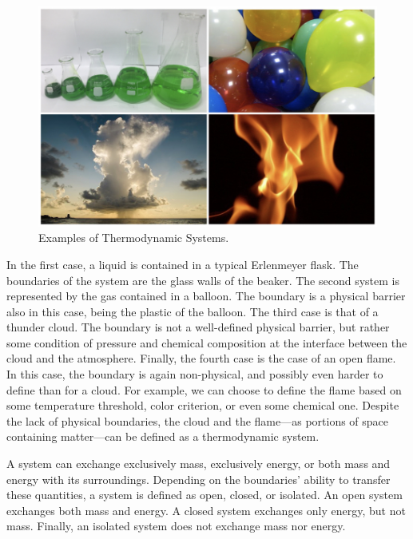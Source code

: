 \documentclass[
  9pt,
]{extbook}
\theoremstyle{definition}
\theoremstyle{definition}
\theoremstyle{definition}
\theoremstyle{remark}
\begin{document}
\begin{figure}

{\centering \includegraphics[width=0.7\linewidth]{./img/OEP_Figures.001} 

}

\caption{Examples of Thermodynamic Systems.}\label{fig:Fig1c1}
\end{figure}

In the first case, a liquid is contained in a typical Erlenmeyer flask. The boundaries of the system are the glass walls of the beaker. The second system is represented by the gas contained in a balloon. The boundary is a physical barrier also in this case, being the plastic of the balloon. The third case is that of a thunder cloud. The boundary is not a well-defined physical barrier, but rather some condition of pressure and chemical composition at the interface between the cloud and the atmosphere. Finally, the fourth case is the case of an open flame. In this case, the boundary is again non-physical, and possibly even harder to define than for a cloud. For example, we can choose to define the flame based on some temperature threshold, color criterion, or even some chemical one. Despite the lack of physical boundaries, the cloud and the flame---as portions of space containing matter---can be defined as a thermodynamic system.

A system can exchange exclusively mass, exclusively energy, or both mass and energy with its surroundings. Depending on the boundaries' ability to transfer these quantities, a system is defined as open, closed, or isolated. An open system exchanges both mass and energy. A closed system exchanges only energy, but not mass. Finally, an isolated system does not exchange mass nor energy.
\end{document}
